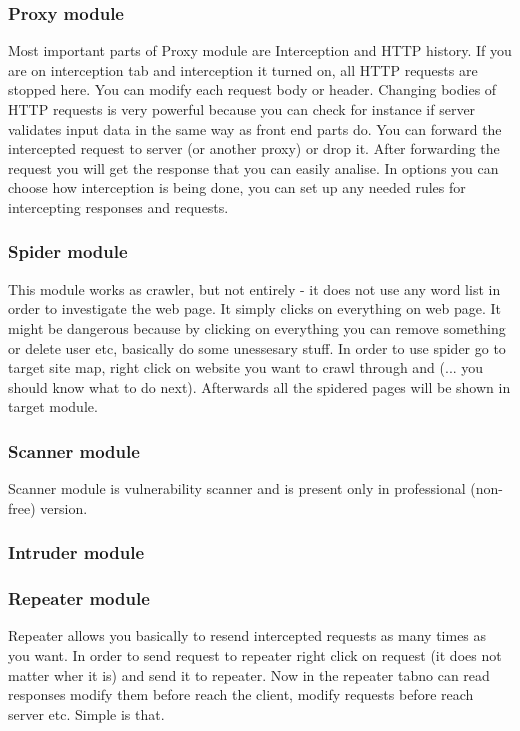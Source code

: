\documentclass{article}[12pt]
\begin{document}
\subsubsection{Proxy module}
Most important parts of Proxy module are Interception and HTTP history.
If you are on interception tab and interception it turned on, all HTTP requests are stopped here.
You can modify each request body or header.
Changing bodies of HTTP requests is very powerful because you can check for instance if server validates input data in the same way as front end parts do.
You can forward the intercepted request to server (or another proxy) or drop it.
After forwarding the request you will get the response that you can easily analise.
In options you can choose how interception is being done, you can set up any needed rules for intercepting responses and requests.

\subsubsection{Spider module}
This module works as crawler, but not entirely - it does not use any word list in order to investigate the web page.
It simply clicks on everything on web page.
It might be dangerous because by clicking on everything you can remove something or delete user etc, basically do some unessesary stuff.
In order to use spider go to target site map, right click on website you want to crawl through and (... you should know what to do next).
Afterwards all the spidered pages will be shown in target module.


\subsubsection{Scanner module}

Scanner module is vulnerability scanner and is present only in professional (non-free) version.

\subsubsection{Intruder module}


\subsubsection{Repeater module}

Repeater allows you basically to resend intercepted requests as many times as you want.
In order to send request to repeater right click on request (it does not matter wher it is) and send it to repeater.
Now in the repeater tabno can read responses modify them before reach the client, modify requests before reach server etc.
Simple is that.
\end{document}
